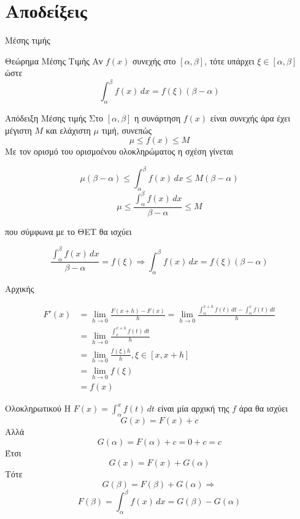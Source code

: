 \documentclass{presentation}
\begin{document}
\appendix
\section{Αποδείξεις}
\begin{frame}{Μέσης τιμής}
    \begin{block}{Θεώρημα Μέσης Τιμής}
        Αν $f(x)$ συνεχής στο $[α,β]$, τότε υπάρχει $ξ\in [α,β]$ ώστε
        $$\int_α^βf(x)\, dx=f(ξ)(β-α)$$
    \end{block}
\end{frame}

\begin{frame}{Απόδειξη Μέσης τιμής}
    Στο $[α,β]$ η συνάρτηση $f(x)$ είναι συνεχής άρα έχει μέγιστη $Μ$ και ελάχιστη $μ$ τιμή, συνεπώς
    $$μ\le f(x) \le Μ$$
    Με τον ορισμό του ορισμοένου ολοκληρώματος η σχέση γίνεται

    $$μ(β-α)\le \int_α^βf(x)\, dx \le Μ(β-α)$$
    $$μ\le \frac{\int_α^βf(x)\, dx}{β-α} \le Μ$$

    που σύμφωνα με το ΘΕΤ θα ισχύει

    $$\frac{\int_α^βf(x)\, dx}{β-α}=f(ξ)\Rightarrow \int_α^βf(x)\, dx=f(ξ)(β-α)$$

\end{frame}

\begin{frame}{Αρχικής}

    \begin{align*}
        F'(x) & =\lim_{h\to 0}\frac{F(x+h)-F(x)}{h}=\lim_{h\to 0}\frac{\int_α^{x+h} f(t) \, dt-\int_α^x f(t) \, dt}{h} \\
              & =\lim_{h\to 0}\frac{\int_x^{x+h} f(t) \, dt}{h}                                                        \\
              & = \lim_{h\to 0}\frac{f(ξ)h}{h},ξ\in[x,x+h]                                                             \\
              & = \lim_{h\to 0}f(ξ)                                                                                    \\
              & =f(x)
    \end{align*}

\end{frame}

\begin{frame}{Ολοκληρωτικού}
    Η $F(x)=\int_α^x f(t) \, dt$ είναι μία αρχική της $f$ άρα θα ισχύει
    $$G(x)=F(x)+c$$
    Αλλά $$G(α)=F(α)+c=0+c=c$$
    Έτσι $$G(x)=F(x)+G(α)$$
    Τότε $$G(β)=F(β)+G(α)\Rightarrow$$
    $$ F(β)=\int_α^β f(x) \, dx=G(β)-G(α)$$
\end{frame}
\end{document}
